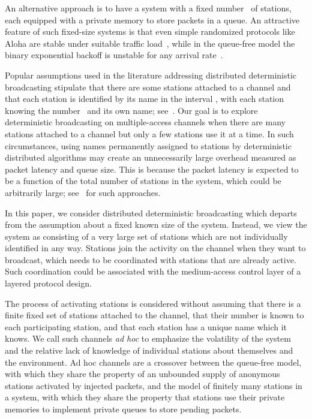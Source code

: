 \documentclass[11pt]{article}
\begin{document}
An alternative approach is to have a system with a fixed number~ of stations, each equipped with a private memory to store packets in a queue.
An attractive feature of such fixed-size systems is that even simple randomized protocols like Aloha are stable under suitable traffic load~\cite{TsybakovM79}, while in the queue-free model the binary exponential backoff is unstable for any arrival rate~\cite{Aldous-TIT87}.

Popular assumptions used in the literature addressing distributed deterministic broadcasting stipulate that there are some  stations attached to a channel and that each station is identified by its name in the interval , with each station knowing the number~ and its own name; see~\cite{AnantharamuCKR-INFOCOM10, AnantharamuCKR-SIROCCO11, AnantharamuCR-OPODIS09, ChlebusKR09, ChlebusKR-TALG12}.
Our goal is to explore deterministic broadcasting on multiple-access channels when there are many stations attached to a channel but only a few stations use it at a time.
In such circumstances, using names permanently assigned to stations by deterministic distributed algorithms may create an unnecessarily large overhead measured as packet latency and queue size.
This is because the  packet latency is expected to  be a function of the total number of stations in the system, which could be arbitrarily large; see~\cite{AnantharamuCKR-INFOCOM10, AnantharamuCKR-SIROCCO11} for such approaches.

In this paper, we consider distributed deterministic broadcasting which departs from the assumption about a fixed known size of the system.
Instead, we view the system as consisting of a very large set of stations which are not individually identified in any way.
Stations  join the activity on the channel when they want to broadcast, which needs to be coordinated with stations that are already active.
Such coordination could be associated with the medium-access control layer \cite{Keshav-book97} of a layered protocol design.

The process of activating stations is considered without assuming that there is a finite fixed set of stations attached to the channel, that their number is known to each participating station, and that each station has a unique name which it knows. 
We call such channels \emph{ad hoc} to emphasize the volatility of the system and the relative lack of knowledge of individual stations about themselves and the environment.
Ad hoc channels are a crossover between the queue-free model, with which they share the property of an unbounded supply of anonymous stations activated by injected packets, and the model of finitely many stations in a system, with which they share the property that stations use their private memories to implement private queues to store pending packets.
\end{document}
